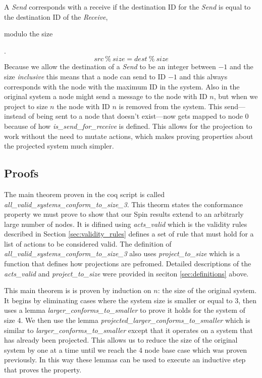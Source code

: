 \documentclass[runningheads]{llncs}
\begin{document}
A \emph{Send} corresponds with a receive if the destination ID for the \emph{Send} is equal to the destination ID of the \emph{Receive}, \begin{bf}modulo the size\end{bf}.
$$src~\%~size = dest~\%~size$$
Because we allow the destination of a \emph{Send} to be an integer between $-1$ and the size \emph{inclusive} this means that a node can send to ID $-1$ and this always corresponds with the node with the maximum ID in the system. Also in the original system a node might send a message to the node with ID $n$, but when we project to size $n$ the node with ID $n$ is removed from the system. This send---instead of being sent to a node that doesn't exist---now gets mapped to node $0$ because of how \emph{is\_send\_for\_receive} is defined. This allows for the projection to work without the need to mutate actions, which makes proving properties about the projected system much simpler.  

\subsection{Proofs}

The main theorem proven in the coq script is called \emph{all\_valid\_systems\_conform\_to\_size\_3}. This theorm states the conformance property we must prove to show that our Spin results extend to an arbitrarly large number of nodes. It is difined using \emph{acts\_valid} which is the validity rules described in Section \ref{sec:validity_rules} defines a set of rule that must hold for a list of actions to be considered valid. The definition of \emph{all\_valid\_systems\_conform\_to\_size\_3} also uses \emph{project\_to\_size} which is a function that defines how projections are pefromed. Detailed descriptions of the \emph{acts\_valid} and \emph{project\_to\_size} were provided in seciton \ref{sec:definitions} above.

This main theorem is is proven by induction on $n$: the size of the original system. It begins by eliminating cases where the system size is smaller or equal to 3, then uses a lemma \emph{larger\_conforms\_to\_smaller} to prove it holds for the system of size 4. We then use the lemma \emph{projected\_larger\_conforms\_to\_smaller} which is similar to \emph{larger\_conforms\_to\_smaller} except that it operates on a system that has already been projected. This allows us to reduce the size of the original system by one at a time until we reach the 4 node base case which was proven previously.  In this way these lemmas can be used to execute an inductive step that proves the property. 
\end{document}
